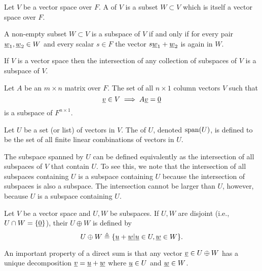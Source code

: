 \begin{definition}
Let $V$ be a vector space over $F$.
A  of $V$ is a subset $W \subset V$ which is itself a vector space over $F$.
\end{definition}

\begin{fact}
A non-empty subset $W \subset V$ is a subspace of $V$ if and only if for every pair $\underline{w}_1, \underline{w}_2 \in W$ and every scalar $s \in F$ the vector $s \underline{w}_1 + \underline{w}_2$ is again in $W$.
\end{fact}
If $V$ is a vector space then the intersection of any collection of subspaces of $V$ is a subspace of $V$.

\begin{example}
Let $A$ be an $m \times n$ matrix over $F$.
The set of all $n \times 1$ column vectors $V$ such that
\begin{equation*}
\underline{v} \in V \implies A \underline{v} = \underline{0}
\end{equation*}
is a subspace of $F^{n \times 1}$.
\end{example}

\begin{definition}
Let $U$ be a set (or list) of vectors in $V$.
The  of $U$, denoted $\mathrm{span}(U)$, is defined to be the set of all finite linear combinations of vectors in $U$.
\end{definition}

The subspace spanned by $U$ can be defined equivalently as the intersection of all subspaces of $V$ that contain $U$.
To see this, we note that the intersection of all subspaces containing $U$ is a subspace containing $U$ because the intersection of subspaces is also a subspace.
The intersection cannot be larger than $U$, however, because $U$ is a subspace containing $U$.

\begin{definition}
Let $V$ be a vector space and $U,W$ be subspaces.
If $U,W$ are disjoint (i.e., $U\cap W = \{ \underline{0} \}$), their  $U \oplus W$ is defined by
\[ U \oplus W \triangleq \{\underline{u}+\underline{w} | \underline{u} \in U, \underline{w} \in W \}. \]
\end{definition}

An important property of a direct sum is that any vector $\underline{v} \in U \oplus W$ has a unique decomposition $\underline{v} = \underline{u} + \underline{w}$ where $\underline{u} \in U$ and $\underline{w} \in W$.
 
